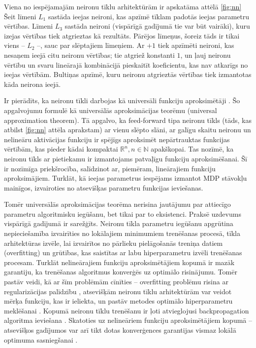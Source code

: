 \documentclass{ludis} %
\begin{document}
Viena no iespējamajām neironu tīklu arhitektūrām ir apskatāma attēlā \ref{fig:nn}
Šeit līmeni $L_1$ sastāda ieejas neironi, kas apzīmē tīklam padotās ieejas parametru vērtības.
Līmeni $L_3$ sastāda neironi (vispārīgā gadījumā tie var būt vairāki), kuru izejas vērtības tiek atgrieztas kā rezultāts.
Pārējos līmeņus, šoreiz tāds ir tikai viens -- $L_2$ --, sauc par slēptajiem līmeņiem.
Ar $+1$ tiek apzīmēti neironi, kas nesaņem ieejā citu neironu vērtības; tie atgriež konstanti $1$, un ļauj neironu vērtību un svaru lineārajā kombinācijā pieskaitīt koeficientu, kas nav atkarīgs no ieejas vērtībām.
Bultiņas apzīmē, kuru neironu atgrieztās vērtības tiek izmantotas kāda neirona ieejā.

Ir pierādīts, ka neironu tīkli darbojas kā universāli funkciju aproksimētāji \autocite{hornik1991approximation}.
Šo apgalvojumu formulē kā universālās aproksimācijas teorēmu (universal approximation theorem).
Tā apgalvo, ka feed-forward tipa neironu tīkls (tāds, kas atbilst \ref{fig:nn} attēla aprakstam) ar vienu slēpto slāni, ar galīgu skaitu neironu un nelineāru aktivācijas funkciju ir spējīgs aproksimēt nepārtrauktas funkcijas vērtībām, kas pieder kādai kompaktai $\mathbb{R}^n, n \in \mathbb{N}$ apakškopai.
Tas nozīmē, ka neironu tīkls ar pietiekamu ir izmantojams patvaļīgu funkciju aproksimēšanai.
Šī ir nozīmīga priekšrocība, salīdzinot ar, piemēram, lineārajiem funkciju aproksimājiem.
Turklāt, kā ieejas parametrus iespējams izmantot MDP stāvokļu mainīgos, izvairoties no atsevišķas parametru funkcijas ieviešanas.

Tomēr universālās aproksimācijas teorēma nerisina jautājumu par attiecīgo parametru algoritmisku iegūšanu, bet tikai par to eksistenci.
Praksē uzdevums vispārīgā gadījumā ir sarežģīts.
Neironu tīkla parametru iegūšanu apgrūtina nepieciešamība izvairīties no lokālajiem minimumiem trenēšanas procesā, tīkla arhitektūras izvēle, lai izvairītos no pārlieku pielāgošanās treniņa datiem (overfitting) un grūtības, kas saistītas ar labu hiperparametru izvēli trenēšanas procesam.
Turklāt nelineārajiem funkciju aproksimētājiem kopumā ir mazāk garantiju, ka trenēšanas algoritmus konverģēs uz optimālo risinājumu.
Tomēr pastāv veidi, kā ar šīm problēmām cīnīties -- overfitting problēmu risina ar regularizācijas palīdzību \autocite{sarle1995stopped} \autocite{srivastava2014dropout}, atsevišķām neironu tīklu arhitektūrām var veidot mērķa funkciju, kas ir ieliekta, un pastāv metodes optimālo hiperparametru meklēšanai \autocite{bergstra2011algorithms}.
Kopumā neironu tīklu trenēšanu ir ļoti atvieglojusi backpropagation algoritma ieviešana \autocite{Werbos74} \autocite{Rumelhart1988}.
Skatoties uz nelineāriem funkciju aproksimētājiem kopumā -- atsevišķos gadījumos var arī tikt dotas konverģences garantijas vismaz lokālā optimuma sasniegšanai \autocite{bhatnagar2009convergent}.
\end{document}
